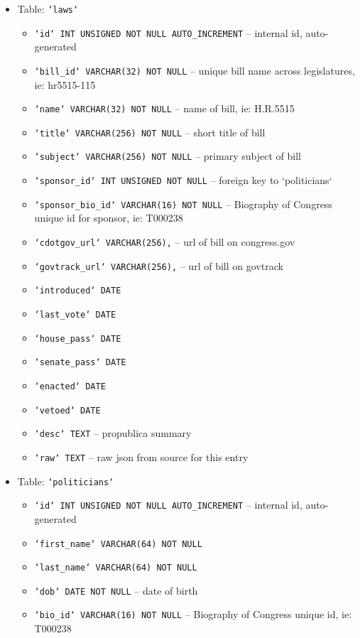 \documentclass[12pt]{article}
\newcommand{\code}[1]{\texttt{#1}}
\begin{document}
\begin{itemize}
	\item[] Table: \code{`laws`}
	\begin{itemize}
		\item \code{`id` INT UNSIGNED NOT NULL AUTO\_INCREMENT}	-- internal id, auto-generated
		\item \code{`bill\_id` VARCHAR(32) NOT NULL}			-- unique bill name across legislatures, ie: hr5515-115
		\item \code{`name` VARCHAR(32) NOT NULL}				-- name of bill, ie: H.R.5515
		\item \code{`title` VARCHAR(256) NOT NULL}				-- short title of bill
		\item \code{`subject` VARCHAR(256) NOT NULL}			-- primary subject of bill
		\item \code{`sponsor\_id` INT UNSIGNED NOT NULL}		-- foreign key to `politicians`
		\item \code{`sponsor\_bio\_id` VARCHAR(16) NOT NULL}	-- Biography of Congress unique id for sponsor, ie: T000238
		\item \code{`cdotgov\_url` VARCHAR(256),}				-- url of bill on congress.gov
		\item \code{`govtrack\_url` VARCHAR(256),}				-- url of bill on govtrack
		\item \code{`introduced` DATE}
		\item \code{`last\_vote` DATE}
		\item \code{`house\_pass` DATE}
		\item \code{`senate\_pass` DATE}
		\item \code{`enacted` DATE}
		\item \code{`vetoed` DATE}
		\item \code{`desc` TEXT}								-- propublica summary
		\item \code{`raw` TEXT}									-- raw json from source for this entry
	\end{itemize}
	\item[] Table: \code{`politicians`}
	\begin{itemize}
		\item \code{`id` INT UNSIGNED NOT NULL AUTO\_INCREMENT}	-- internal id, auto-generated
		\item \code{`first\_name` VARCHAR(64) NOT NULL}
		\item \code{`last\_name` VARCHAR(64) NOT NULL}
		\item \code{`dob` DATE NOT NULL}						-- date of birth
		\item \code{`bio\_id` VARCHAR(16) NOT NULL}				-- Biography of Congress unique id, ie: T000238

\end{itemize}
\end{itemize}
\end{document}
